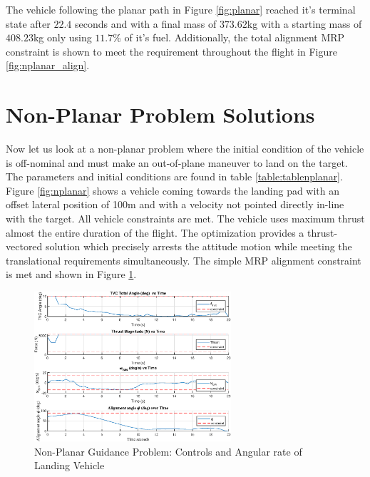\documentclass[conf]{new-aiaa}
\begin{document}
The vehicle following the planar path in Figure \ref{fig:planar} reached it's terminal state after $22.4$ seconds and with a final mass of $373.62$kg with a starting mass of $408.23$kg only using $11.7$\% of it's fuel. Additionally, the total alignment MRP constraint is shown to meet the requirement throughout the flight in Figure \ref{fig:nplanar_align}.


\section{Non-Planar Problem Solutions}
Now let us look at a non-planar problem where the initial condition of the vehicle is off-nominal and must make an out-of-plane maneuver to land on the target. The parameters and initial conditions are found in table \ref{table:tablenplanar}. Figure \ref{fig:nplanar} shows a vehicle coming towards the landing pad with an offset lateral position of 100m and with a velocity not pointed directly in-line with the target. All vehicle constraints are met. The vehicle uses maximum thrust almost the entire duration of the flight. The optimization provides a thrust-vectored solution which precisely arrests the attitude motion while meeting the translational requirements simultaneously. The simple MRP alignment constraint is met and shown in Figure \ref{fig:nplanarcontrols}.

\begin{figure}[!htbp] 
  \centering
  \includegraphics[width=0.65\textwidth]{figs/nonplanar_controls.eps}
  \caption{Non-Planar Guidance Problem: Controls and Angular rate of Landing Vehicle}
  \label{fig:nplanarcontrols}
 \end{figure}
\end{document}
